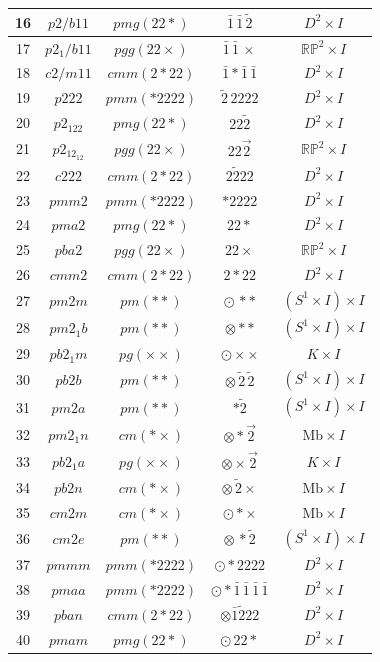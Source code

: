 \documentclass[11pt]{article}
\begin{document}
\begin{table}[htbp]
{\begin{tabular}{|c|c|c|c|c|}
\hline
16 & $p2/b11$ & $pmg (22*)$ & $\bar{1} \, \bar{1} \,\tilde{2}$ & $D^2 \times I$\\
\hline
17 & $p2_1/b11$ & $pgg (22\times)$ & $\bar{1} \, \bar{1} \,\times$ & $\mathbb{RP}^2 \times I$ \\
\hline
18 & $c2/m11$ & $cmm (2*22)$ & $\bar{1} * \bar{1} \,  \bar{1}$ & $D^2 \times I$ \\
\hline
19 & $p222$ & $pmm (*2222)$ & $\tilde{2}\,2222$ & $D^2 \times I$ \\
\hline
20 & $p2_122$ & $pmg (22*)$ & $22\tilde{2}$ & $D^2 \times I$  \\
\hline
21 & $p2_12_12$ & $pgg (22\times)$ & $22\vec{2}$ & $\mathbb{RP}^2 \times I$ \\
\hline
22 & $c222$ & $cmm (2*22)$ & $2 \tilde{2} 22$ & $D^2 \times I$ \\
\hline
23 & $pmm2$ &$pmm (*2222)$ & $*2222$ & $D^2 \times I$ \\
\hline
24 & $pma2$ &$pmg (22*)$ & $22*$ & $D^2 \times I$ \\
\hline
25 & $pba2$ &$pgg (22\times)$ & $22\times$ & $\mathbb{RP}^2 \times I$ \\
\hline
26 & $cmm2$ &$cmm (2*22)$ & $2*22$ & $D^2 \times I$ \\
\hline
27 & $pm2m$ &$pm (**)$ & $\odot\,**$ & $(S^1 \times I) \times I$ \\
\hline
28 & $pm2_1b$ &$pm (**)$ & $\otimes**$ & $(S^1 \times I) \times I$ \\
\hline
29 & $pb2_1m$ &$pg (\times\times)$ & $\odot\times\times$ & $K \times I$ \\
\hline
30 & $pb2b$ &$pm (**)$ & $\otimes\,\tilde{2}\,\tilde{2}$ & $(S^1 \times I) \times I$  \\
\hline
31 & $pm2a$ &$pm (**)$ & $*\tilde{2}$ & $(S^1 \times I) \times I$ \\
\hline
32 & $pm2_1n$ &$cm (*\times)$ & $\otimes*\vec{2}$ & $\mathrm{Mb} \times I$ \\
\hline
33 & $pb2_1a$ &$pg (\times\times)$ & $\otimes\times\vec{2}$ & $K \times I$ \\
\hline
34 & $pb2n$ &$cm (*\times)$ & $\otimes\,\tilde{2}\times$ & $\mathrm{Mb} \times I$ \\
\hline
35 & $cm2m$ &$cm (*\times)$ & $\odot*\times$ & $\mathrm{Mb} \times I$ \\
\hline
36 & $cm2e$ &$pm (**)$ & $\otimes\,*\tilde{2}$ & $(S^1 \times I) \times I$ \\
\hline
37 & $pmmm$ &$pmm (*2222)$ & $\odot*2222$ & $D^2 \times I$ \\
\hline
38 & $pmaa$ &$pmm (*2222)$ & $\odot*\bar{1} \, \bar{1} \, \bar{1} \, \bar{1}$ & $D^2 \times I$ \\
\hline
39 & $pban$ &$cmm (2*22)$ & $\otimes \bar{1} \tilde{2} 2 2$ & $D^2 \times I$ \\
\hline
40 & $pmam$ &$pmg (22*)$ & $\odot \, 22*$ & $D^2 \times I$ \\
\hline
\end{tabular}
}
\end{table}
\end{document}
